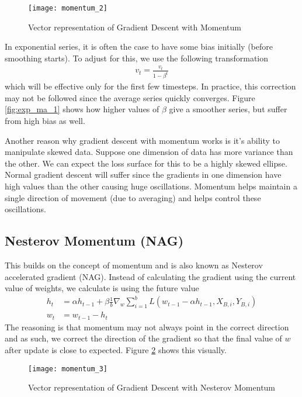 \documentclass[../../deep_learning_notes.tex]{subfiles}
\begin{document}
\begin{figure}[h]
    \texttt{[image: momentum\_2]}
    \centering
    \caption {Vector representation of Gradient Descent with Momentum}
    \label{fig:momentum_2} %
\end{figure}

In exponential series, it is often the case to have some bias initially (before smoothing starts). To adjust for this, we use the following transformation
\begin{align*}
    v_{t} = \frac{v_{t}}{1 - \beta^{t}}
\end{align*}
which will be effective only for the first few timesteps. In practice, this correction may not be followed since the average series quickly converges. Figure \ref{fig:exp_ma_1} shows how higher values of $\beta$ give a smoother series, but suffer from high bias as well.\newline

Another reason why gradient descent with momentum works is it's ability to manipulate skewed data. Suppose one dimension of data has more variance than the other. We can expect the loss surface for this to be a highly skewed ellipse. Normal gradient descent will suffer since the gradients in one dimension have high values than the other causing huge oscillations. Momentum helps maintain a single direction of movement (due to averaging) and helps control these oscillations.


\subsection{Nesterov Momentum (NAG)}
This builds on the concept of momentum and is also known as Nesterov accelerated gradient (NAG). Instead of calculating the gradient using the current value of weights, we calculate is using the future value
\begin{align*}
    h_{t} &= \alpha h_{t-1} + \beta \frac{1}{b}\nabla_{w} \sum_{i=1}^{b} L(w_{t-1} - \alpha h_{t-1}, X_{B,i}, Y_{B,i})\\
    w_{t} &= w_{t-1} - h_{t}
\end{align*}
The reasoning is that momentum may not always point in the correct direction and as such, we correct the direction of the gradient so that the final value of $w$ after update is close to expected. Figure \ref{fig:momentum_3} shows this visually.
\begin{figure}[h]
    \texttt{[image: momentum\_3]}
    \centering
    \caption {Vector representation of Gradient Descent with Nesterov Momentum}
    \label{fig:momentum_3} %
\end{figure}
\end{document}
